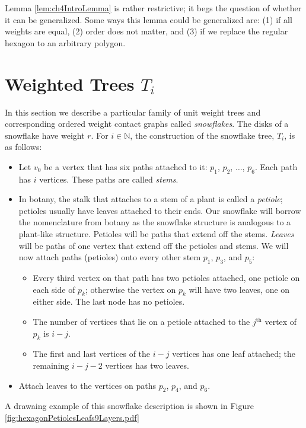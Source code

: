 \documentclass[10pt]{CSUNthesis}
\theoremstyle{plain}%
\theoremstyle{definition}
\theoremstyle{remark}
\newcommand{\jth}{j^\text{th}}
\newcommand{\bbN}{{\mathbb{N}}}
\begin{document}
Lemma \ref{lem:ch4IntroLemma} is rather restrictive; it begs the question of whether it can be generalized. Some ways this lemma could be generalized are: (1) if all weights are equal, (2) order does not matter, and (3) if we replace the regular hexagon to an arbitrary polygon. \section{Weighted Trees $T_i$}
In this section we describe a particular family of unit weight trees and corresponding ordered weight contact graphs called \textit{snowflakes}.  
The disks of a snowflake have weight $r$.  
For $i \in \bbN$, the construction of the snowflake tree, $T_i$, is as follows:
\begin{itemize}
\item Let $v_0$ be a vertex that has six paths attached to it: $p_1$, $p_2$, $\dots$, $p_6$.  
Each path has $i$ vertices. 
These paths are called \textit{stems}.
\item In botany, the stalk that attaches to a stem of a plant is called a \textit{petiole}; petioles usually have leaves attached to their ends.  
Our snowflake will borrow the nomenclature from botany as the snowflake structure is analogous to a plant-like structure.  
Petioles will be paths that extend off the stems.  
\textit{Leaves} will be paths of one vertex that extend off the petioles and stems.  
We will now attach paths (petioles) onto every other stem $p_1$, $p_3$, and $p_5$: 
	\begin{itemize}
		\item 	Every third vertex on that path has two petioles attached, one petiole on each side of $p_k$; otherwise the vertex on $p_k$ will have two leaves, one on either side.  The last node has no petioles.
		\item	The number of vertices that lie on a petiole attached to the $\jth$ vertex of  $p_k$ is $i-j$.
		\item The first and last vertices of the $i-j$ vertices has one leaf attached; the remaining $i-j-2$ vertices has two leaves. %
	\end{itemize}
\item Attach leaves to the vertices on paths $p_2$, $p_4$, and $p_6$.
\end{itemize}
A drawaing example of this snowflake description is shown in Figure \ref{fig:hexagonPetiolesLeafs9Layers.pdf}
\end{document}
